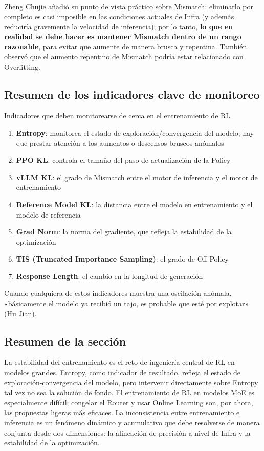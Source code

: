 Zheng Chujie añadió su punto de vista práctico sobre Mismatch: eliminarlo por completo es casi imposible en las condiciones actuales de Infra (y además reduciría gravemente la velocidad de inferencia); por lo tanto, \textbf{lo que en realidad se debe hacer es mantener Mismatch dentro de un rango razonable}, para evitar que aumente de manera brusca y repentina. También observó que el aumento repentino de Mismatch podría estar relacionado con Overfitting.

\subsection{Resumen de los indicadores clave de monitoreo}

\begin{importantbox}{Indicadores que deben monitorearse de cerca en el entrenamiento de RL}
\begin{enumerate}
    \item \textbf{Entropy}: monitorea el estado de exploración/convergencia del modelo; hay que prestar atención a los aumentos o descensos bruscos anómalos
    \item \textbf{PPO KL}: controla el tamaño del paso de actualización de la Policy
    \item \textbf{vLLM KL}: el grado de Mismatch entre el motor de inferencia y el motor de entrenamiento
    \item \textbf{Reference Model KL}: la distancia entre el modelo en entrenamiento y el modelo de referencia
    \item \textbf{Grad Norm}: la norma del gradiente, que refleja la estabilidad de la optimización
    \item \textbf{TIS (Truncated Importance Sampling)}: el grado de Off-Policy
    \item \textbf{Response Length}: el cambio en la longitud de generación
\end{enumerate}
Cuando cualquiera de estos indicadores muestra una oscilación anómala, «básicamente el modelo ya recibió un tajo, es probable que esté por explotar» (Hu Jian).
\end{importantbox}

\subsection{Resumen de la sección}

La estabilidad del entrenamiento es el reto de ingeniería central de RL en modelos grandes. Entropy, como indicador de resultado, refleja el estado de exploración-convergencia del modelo, pero intervenir directamente sobre Entropy tal vez no sea la solución de fondo. El entrenamiento de RL en modelos MoE es especialmente difícil; congelar el Router y usar Online Learning son, por ahora, las propuestas ligeras más eficaces. La inconsistencia entre entrenamiento e inferencia es un fenómeno dinámico y acumulativo que debe resolverse de manera conjunta desde dos dimensiones: la alineación de precisión a nivel de Infra y la estabilidad de la optimización.
